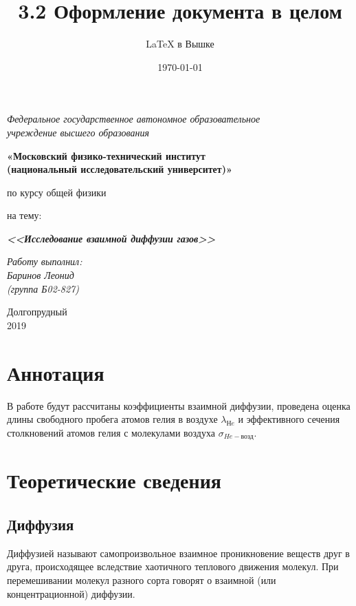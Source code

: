 \documentclass[a4paper,12pt]{article}
\author{\LaTeX{} в Вышке}
\title{3.2 Оформление документа в целом}
\date{\today}
\theoremstyle{plain} %
\theoremstyle{definition} %
\theoremstyle{remark} %
\begin{document}
	\thispagestyle{empty}
	\begin{center}
		\textit{Федеральное государственное автономное образовательное\\ учреждение высшего образования }
		\vspace{0.5ex}
		
		\textbf{«Московский физико-технический институт\\ (национальный исследовательский университет)»}
	\end{center}
	\vspace{10ex}
	\begin{center}
		\vspace{13ex}
		\vspace{1ex}
		
		по курсу общей физики
		
		
		на тему:
		
		\textbf{\textit{<<Исследование взаимной диффузии газов>>}}
		\vspace{30ex}
		\begin{flushright}
			\noindent
			\textit{Работу выполнил:}
			\\
			\textit{Баринов Леонид \\(группа Б02-827)}
		\end{flushright}
		\vfill
		Долгопрудный \\2019
	\end{center}
	\newpage
	\setcounter{page}{1}
	\section{Аннотация}
	\fancyhead[R]{\nouppercase{\leftmark}}
	В работе будут рассчитаны коэффициенты взаимной диффузии, проведена оценка длины свободного пробега атомов гелия в воздухе $\lambda_{Нe}$ и эффективного сечения столкновений атомов гелия с молекулами воздуха $\sigma_{He-\text{возд}}$.
	\section{Теоретические сведения}
	\subsection{Диффузия}
	Диффузией называют самопроизвольное взаимное проникновение веществ друг в друга, происходящее вследствие хаотичного теплового движения молекул. При перемешивании молекул разного сорта говорят о взаимной (или концентрационной) диффузии.
\end{document}

